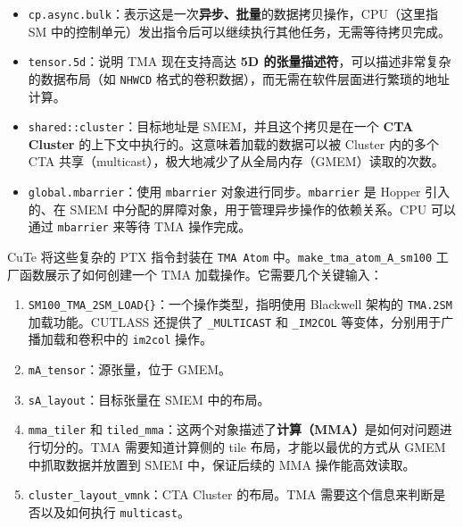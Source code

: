 \begin{itemize}
\item \texttt{cp.\allowbreak{}async.\allowbreak{}bulk}：表示这是一次\textbf{异步、批量}的数据拷贝操作，CPU（这里指 SM 中的控制单元）发出指令后可以继续执行其他任务，无需等待拷贝完成。
\item \texttt{tensor.\allowbreak{}5d}：说明 TMA 现在支持高达 \textbf{5\allowbreak{}D 的张量描述符}，可以描述非常复杂的数据布局（如 \texttt{NHWCD} 格式的卷积数据），而无需在软件层面进行繁琐的地址计算。
\item \texttt{shared::\allowbreak{}cluster}：目标地址是 SMEM，并且这个拷贝是在一个 \textbf{CTA Cluster} 的上下文中执行的。这意味着加载的数据可以被 Cluster 内的多个 CTA 共享（multicast），极大地减少了从全局内存（GMEM）读取的次数。
\item \texttt{global.\allowbreak{}mbarrier}：使用 \texttt{mbarrier} 对象进行同步。\texttt{mbarrier} 是 Hopper 引入的、在 SMEM 中分配的屏障对象，用于管理异步操作的依赖关系。CPU 可以通过 \texttt{mbarrier} 来等待 TMA 操作完成。
\end{itemize}

Cu\allowbreak{}Te 将这些复杂的 PTX 指令封装在 \texttt{TMA Atom} 中。\texttt{make\_\allowbreak{}tma\_\allowbreak{}atom\_\allowbreak{}A\_\allowbreak{}sm100} 工厂函数展示了如何创建一个 TMA 加载操作。它需要几个关键输入：

\begin{enumerate}
\item \texttt{SM100\_\allowbreak{}TMA\_\allowbreak{}2\allowbreak{}SM\_\allowbreak{}LOAD\{\}}：一个操作类型，指明使用 Blackwell 架构的 \texttt{TMA.\allowbreak{}2\allowbreak{}SM} 加载功能。CUTLASS 还提供了 \texttt{\_\allowbreak{}MULTICAST} 和 \texttt{\_\allowbreak{}IM2\allowbreak{}COL} 等变体，分别用于广播加载和卷积中的 \texttt{im2col} 操作。
\item \texttt{m\allowbreak{}A\_\allowbreak{}tensor}：源张量，位于 GMEM。
\item \texttt{s\allowbreak{}A\_\allowbreak{}layout}：目标张量在 SMEM 中的布局。
\item \texttt{mma\_\allowbreak{}tiler} 和 \texttt{tiled\_\allowbreak{}mma}：这两个对象描述了\textbf{计算（MMA）}是如何对问题进行切分的。TMA 需要知道计算侧的 tile 布局，才能以最优的方式从 GMEM 中抓取数据并放置到 SMEM 中，保证后续的 MMA 操作能高效读取。
\item \texttt{cluster\_\allowbreak{}layout\_\allowbreak{}vmnk}：CTA Cluster 的布局。TMA 需要这个信息来判断是否以及如何执行 \texttt{multicast}。
\end{enumerate}

